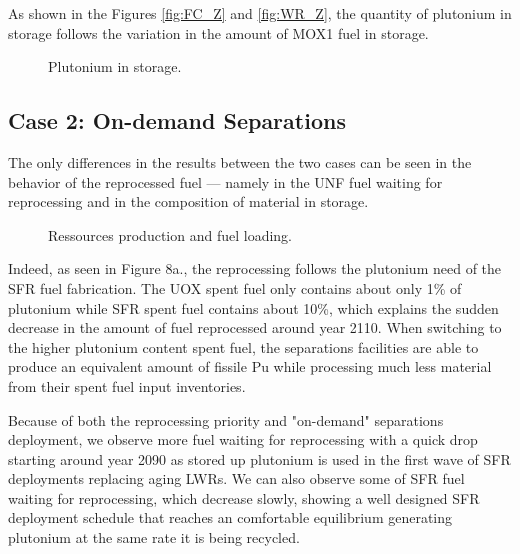 \documentclass[12pt]{article}
\begin{document}
As shown in the Figures \ref{fig:FC_Z} and \ref{fig:WR_Z}, the quantity of
plutonium in storage follows the variation in the amount of MOX1 fuel in
storage.

\begin{figure}[h!]
    \centering
    \caption{Plutonium in storage.\label{fig:FC_WR_zoom} }
\end{figure}

\subsection{Case 2: On-demand Separations}

The only differences in the results between the two cases can be seen in the
behavior of the reprocessed fuel --- namely in the UNF fuel waiting for
reprocessing and in the composition of material in storage.

\begin{figure}[h!]
    \centering
    \caption{Ressources production and fuel loading.\label{fig:ARR_FWR_SFC_2} }
\end{figure}

Indeed, as seen in Figure 8a., the reprocessing follows the plutonium need of
the SFR fuel fabrication. The UOX spent fuel only contains about only 1\% of
plutonium while SFR spent fuel contains about 10\%, which explains the sudden
decrease in the amount of fuel reprocessed around year 2110.  When switching
to the higher plutonium content spent fuel, the separations facilities are
able to produce an equivalent amount of fissile Pu while processing much less
material from their spent fuel input inventories.

Because of both the reprocessing priority and "on-demand" separations
deployment, we observe more fuel waiting for reprocessing with a quick drop
starting around year 2090 as stored up plutonium is used in the first wave of
SFR deployments replacing aging LWRs.  We can also observe some of SFR fuel
waiting for reprocessing, which decrease slowly, showing a well designed SFR
deployment schedule that reaches an comfortable equilibrium generating
plutonium at the same rate it is being recycled.
\end{document}
